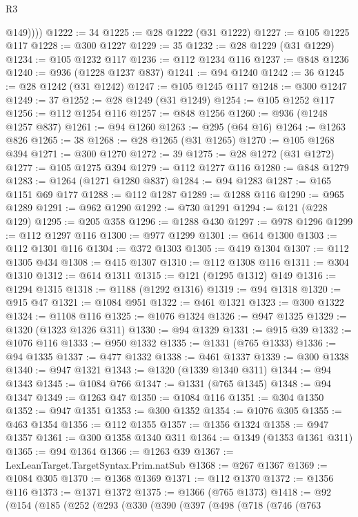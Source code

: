 \begin{lexlean}{R3}
\begin{coremodule}
{{{{{{{{{{{{{{{{{{{{{{{{{{{{{{{{{{{{{{{{{{{{{{{{{{{{{{{{{{{{{{{{{{{{{{{{{{{            @149))))
@1222 := 34
@1225 := @28 @1222 (@31 @1222)
@1227 := @105 @1225 @117
@1228 := @300 @1227
@1229 := 35
@1232 := @28 @1229 (@31 @1229)
@1234 := @105 @1232 @117
@1236 := @112 @1234 @116
@1237 := @848 @1236
@1240 := @936 (@1228 @1237 @837)
@1241 := @94 @1240
@1242 := 36
@1245 := @28 @1242 (@31 @1242)
@1247 := @105 @1245 @117
@1248 := @300 @1247
@1249 := 37
@1252 := @28 @1249 (@31 @1249)
@1254 := @105 @1252 @117
@1256 := @112 @1254 @116
@1257 := @848 @1256
@1260 := @936 (@1248 @1257 @837)
@1261 := @94 @1260
@1263 := @295 (@64 @16)
@1264 := @1263 @826
@1265 := 38
@1268 := @28 @1265 (@31 @1265)
@1270 := @105 @1268 @394
@1271 := @300 @1270
@1272 := 39
@1275 := @28 @1272 (@31 @1272)
@1277 := @105 @1275 @394
@1279 := @112 @1277 @116
@1280 := @848 @1279
@1283 := @1264 (@1271 @1280 @837)
@1284 := @94 @1283
@1287 := @165 @1151 @69 @177
@1288 := @112 @1287
@1289 := @1288 @116
@1290 := @965 @1289
@1291 := @962 @1290
@1292 := @730 @1291
@1294 := @121 (@228 @129)
@1295 := @205 @358
@1296 := @1288 @430
@1297 := @978 @1296
@1299 := @112 @1297 @116
@1300 := @977 @1299
@1301 := @614 @1300
@1303 := @112 @1301 @116
@1304 := @372 @1303
@1305 := @419 @1304
@1307 := @112 @1305 @434
@1308 := @415 @1307
@1310 := @112 @1308 @116
@1311 := @304 @1310
@1312 := @614 @1311
@1315 := @121 (@1295 @1312) @149
@1316 := @1294 @1315
@1318 := @1188 (@1292 @1316)
@1319 := @94 @1318
@1320 := @915 @47
@1321 := @1084 @951
@1322 := @461 @1321
@1323 := @300 @1322
@1324 := @1108 @116
@1325 := @1076 @1324
@1326 := @947 @1325
@1329 := @1320 (@1323 @1326 @311)
@1330 := @94 @1329
@1331 := @915 @39
@1332 := @1076 @116
@1333 := @950 @1332
@1335 := @1331 (@765 @1333)
@1336 := @94 @1335
@1337 := @477 @1332
@1338 := @461 @1337
@1339 := @300 @1338
@1340 := @947 @1321
@1343 := @1320 (@1339 @1340 @311)
@1344 := @94 @1343
@1345 := @1084 @766
@1347 := @1331 (@765 @1345)
@1348 := @94 @1347
@1349 := @1263 @47
@1350 := @1084 @116
@1351 := @304 @1350
@1352 := @947 @1351
@1353 := @300 @1352
@1354 := @1076 @305
@1355 := @463 @1354
@1356 := @112 @1355
@1357 := @1356 @1324
@1358 := @947 @1357
@1361 := @300 @1358 @1340 @311
@1364 := @1349 (@1353 @1361 @311)
@1365 := @94 @1364
@1366 := @1263 @39
@1367 := LexLeanTarget.TargetSyntax.Prim.natSub
@1368 := @267 @1367
@1369 := @1084 @305
@1370 := @1368 @1369
@1371 := @112 @1370
@1372 := @1356 @116
@1373 := @1371 @1372
@1375 := @1366 (@765 @1373)
@1418 := @92
    (@154
      (@185
        (@252
          (@293
            (@330
              (@390
                (@397
                  (@498
                    (@718
                      (@746
                        (@763
}}}}}}}}}}}}}}}}}}}}}}}}}}}}}}}}}}}}}}}}}}}}}}}}}}}}}}}}}}}}}}}}}}}}}}}}}}}
\end{coremodule}
\end{lexlean}
